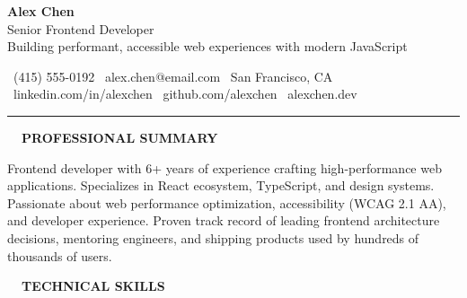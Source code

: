 \documentclass[11pt,a4paper]{article}
\begin{document}
\begin{tcolorbox}[
  colback=primary,
  colframe=primary,
  width=\textwidth,
  arc=0pt,
  outer arc=0pt,
  boxrule=0pt,
  left=0pt,
  right=0pt,
  top=16pt,
  bottom=14pt,
  after={\par\vspace{4pt}}
]
\begin{center}
  {\fontsize{26}{30}\selectfont\bfseries\color{white}Alex Chen}\\[7pt]
  {\Large\color{accent!85}Senior Frontend Developer}\\[3pt]
  {\small\color{white!75}Building performant, accessible web experiences with modern JavaScript}
\end{center}
\end{tcolorbox}

\begin{center}
\small
\faPhone\ (415) 555-0192
\qquad\color{rulegray}\textbar{}\qquad
\faEnvelope\ alex.chen@email.com
\qquad\color{rulegray}\textbar{}\qquad
\faMapMarker*\ San Francisco, CA\\[2pt]
\faLinkedin\ linkedin.com/in/alexchen
\qquad\color{rulegray}\textbar{}\qquad
\faGithub\ github.com/alexchen
\qquad\color{rulegray}\textbar{}\qquad
\faGlobe\ alexchen.dev
\end{center}

\vspace{6pt}
{\color{accent}\rule{\textwidth}{1.2pt}}
\vspace{10pt}

{\large\bfseries\color{primary}\faUser\ \ PROFESSIONAL SUMMARY}
\vspace{5pt}

Frontend developer with 6+ years of experience crafting high-performance web applications.
Specializes in React ecosystem, TypeScript, and design systems. Passionate about web performance
optimization, accessibility (WCAG 2.1 AA), and developer experience. Proven track record of
leading frontend architecture decisions, mentoring engineers, and shipping products used by
hundreds of thousands of users.

\vspace{10pt}

{\large\bfseries\color{primary}\faCode\ \ TECHNICAL SKILLS}
\vspace{6pt}
\end{document}
